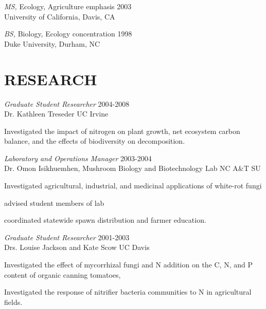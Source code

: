 \documentclass[line]{res}
\begin{document}
\begin{resume}
                {\sl MS,} Ecology, Agriculture emphasis \hfill 2003   \\
                \hfill University of California, Davis, CA


                {\sl BS,} Biology, Ecology concentration \hfill 1998 \\
                \hfill Duke University, Durham, NC 
 
 
\section{RESEARCH} {\sl Graduate Student Researcher} \hfill  2004-2008\\
                 Dr. Kathleen Treseder \hfill UC Irvine
                 \begin{description}  \itemsep -2pt %
                 \item Investigated the impact of nitrogen on plant growth, 
                   net ecosystem carbon balance, 
                   and the effects of biodiversity on decomposition. 
                \end{description}
 
                {\sl Laboratory and Operations Manager} \hfill 2003-2004 \\
                Dr. Omon Isikhuemhen, Mushroom Biology and Biotechnology Lab \hfill NC A\&T SU 
                 \begin{description}  \itemsep -2pt %
                 \item Investigated agricultural, industrial, and medicinal 
                   applications of white-rot fungi
                  \item advised student members of lab
                  \item coordinated statewide spawn distribution
                    and farmer education. 
                 \end{description} 
                
                 {\sl Graduate Student Researcher} \hfill  2001-2003 \\
                 Drs. Louise Jackson and Kate Scow \hfill UC Davis
                  \begin{description}
                   \item Investigated the effect of mycorrhizal fungi and 
                    N addition on the C, N, and P content of organic 
                    canning tomatoes, 
                   \item Investigated the response of nitrifier bacteria 
                    communities to N in agricultural fields.
                   \end{description} 
 

\end{resume}
\end{document}
